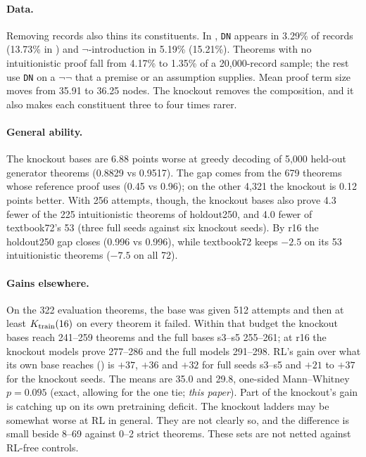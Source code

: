 \paragraph{Data.} Removing \sigp{} records also thins its constituents. In \KTko{}, \texttt{DN} appears in 3.29\% of
records (13.73\% in \KT{}) and $\neg$-introduction in 5.19\% (15.21\%). Theorems with no intuitionistic proof fall from
4.17\% to 1.35\% of a 20,000-record sample; the rest use \texttt{DN} on a $\neg\neg$ that a premise or an assumption
supplies. Mean proof term size moves from 35.91 to 36.25 nodes. The knockout removes the composition, and it also makes
each constituent three to four times rarer.

\paragraph{General ability.} The knockout bases are 6.88 points worse at greedy decoding of 5,000 held-out generator
theorems (0.8829 vs 0.9517). The gap comes from the 679 theorems whose reference proof uses \sig{} (0.45 vs 0.96); on
the other 4,321 the knockout is 0.12 points better. With 256 attempts, though, the knockout bases also prove 4.3 fewer
of the 225 intuitionistic theorems of holdout250, and 4.0 fewer of textbook72's 53 (three full seeds against six
knockout seeds). By r16 the holdout250 gap closes (0.996 vs 0.996), while textbook72 keeps $-2.5$ on its 53 intuitionistic theorems ($-7.5$ on all 72).

\paragraph{Gains elsewhere.} On the 322 evaluation theorems, the base was given 512 attempts and then at least
$K_{\mathrm{train}}(16)$ on every theorem it failed. Within that budget the knockout bases reach 241--259 theorems and the full bases s3--s5
255--261; at r16 the knockout models prove 277--286 and the full models 291--298. RL's gain over what its own base reaches
(\dcov{}) is $+37$, $+36$ and $+32$ for full seeds s3--s5 and $+21$ to $+37$ for the knockout seeds. The means are 35.0
and 29.8, one-sided Mann--Whitney $p = 0.095$ (exact, allowing for the one tie; \emph{this paper}). Part of the knockout's gain is
catching up on its own pretraining deficit. The knockout ladders may be somewhat worse at RL in general. They are not
clearly so, and the difference is small beside 8--69 against 0--2 strict theorems. These sets are not netted against
RL-free controls.

